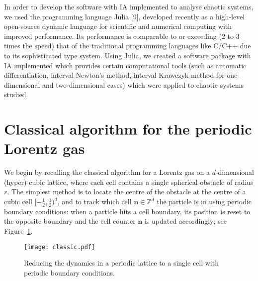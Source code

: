\documentclass[pre,amsmath,amssymb, twocolumn, showpacs]{revtex4-1}
\renewcommand{\vec}[1]{\mathbf{#1}}
\begin{document}
In order to develop the software with IA implemented to analyse chaotic systems, we used the programming language Julia [9], developed recently as a high-level open-source dynamic language for scientific and numerical computing with improved performance. Its performance is comparable to or exceeding (2 to 3 times the speed) that of the traditional programming languages like C/C++ due to its sophisticated type system. Using Julia, we created a software package with IA implemented which provides certain computational tools (such as automatic differentiation, interval Newton's method, interval Krawczyk method for one-dimensional and two-dimensional cases) which were applied to chaotic systems studied.

\section{Classical algorithm for the periodic Lorentz gas}

We begin by recalling the classical algorithm for a Lorentz gas on a $d$-dimensional (hyper)-cubic lattice, where each cell contains a single spherical obstacle of radius $r$. The simplest method is to locate the centre of the obstacle at the centre of a cubic cell $[-\frac{1}{2}, \frac{1}{2})^d$, and to track which cell $\vec{n} \in \mathbb{Z}^{d}$ the particle is in using periodic boundary conditions: when a particle hits a cell boundary, its position is reset to the opposite boundary and the cell counter $\vec{n}$ is updated accordingly; see Figure~\ref{fig:classical}.


\begin{figure}
\centering
\texttt{[image: classic.pdf]}
\caption{Reducing the dynamics in a periodic lattice to a single cell with periodic boundary conditions.}
\label{fig:classical}
\end{figure}



\end{document}

